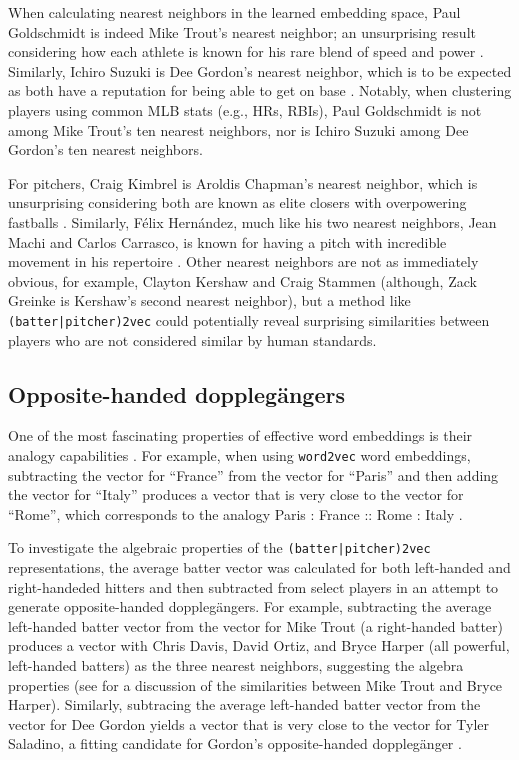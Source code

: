 \documentclass{article}
\begin{document}
When calculating nearest neighbors in the learned embedding space, Paul Goldschmidt is indeed Mike Trout's nearest neighbor; an unsurprising result considering how each athlete is known for his rare blend of speed and power \parencite{Kory2015}. Similarly, Ichiro Suzuki is Dee Gordon's nearest neighbor, which is to be expected as both have a reputation for being able to get on base \parencite{Sullivan2015}. Notably, when clustering players using common MLB stats (e.g., HRs, RBIs), Paul Goldschmidt is not among Mike Trout's ten nearest neighbors, nor is Ichiro Suzuki among Dee Gordon's ten nearest neighbors.

For pitchers, Craig Kimbrel is Aroldis Chapman's nearest neighbor, which is unsurprising considering both are known as elite closers with overpowering fastballs \parencite{Mirsky2016}. Similarly, Félix Hernández, much like his two nearest neighbors, Jean Machi and Carlos Carrasco, is known for having a pitch with incredible movement in his repertoire \parencite{Buchanan2015, Romano2015, Berg2016}. Other nearest neighbors are not as immediately obvious, for example, Clayton Kershaw and Craig Stammen (although, Zack Greinke is Kershaw's second nearest neighbor), but a method like \texttt{(batter|pitcher)2vec} could potentially reveal surprising similarities between players who are not considered similar by human standards.

\subsection{Opposite-handed dopplegängers}

One of the most fascinating properties of effective word embeddings is their analogy capabilities \parencite{Mikolov2013a}. For example, when using \texttt{word2vec} word embeddings, subtracting the vector for ``France'' from the vector for ``Paris'' and then adding the vector for ``Italy'' produces a vector that is very close to the vector for ``Rome'', which corresponds to the analogy Paris : France :: Rome : Italy \parencite{Mikolov2013a}.

To investigate the algebraic properties of the \texttt{(batter|pitcher)2vec} representations, the average batter vector was calculated for both left-handed and right-handeded hitters and then subtracted from select players in an attempt to generate opposite-handed dopplegängers. For example, subtracting the average left-handed batter vector from the vector for Mike Trout (a right-handed batter) produces a vector with Chris Davis, David Ortiz, and Bryce Harper (all powerful, left-handed batters) as the three nearest neighbors, suggesting the algebra properties (see \parencite{Spector2016} for a discussion of the similarities between Mike Trout and Bryce Harper). Similarly, subtracing the average left-handed batter vector from the vector for Dee Gordon yields a vector that is very close to the vector for Tyler Saladino, a fitting candidate for Gordon's opposite-handed dopplegänger \parencite{Chamberlain2017}.
\end{document}
